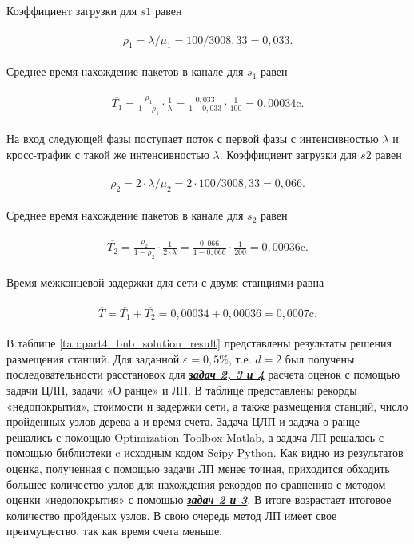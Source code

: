 Коэффициент загрузки для $s1$ равен

\begin{align}
  \begin{aligned}
\rho_1 = \lambda / \mu_1 = 100 / 3008,33 = 0,033.
  \end{aligned}
\end{align}

Среднее время нахождение пакетов в канале для $s_1$ равен

\begin{align}
  \begin{aligned}
  \overline{T_1} = \frac{\rho_1}{1 - \rho_1} \cdot \frac{1}{\lambda} = \frac{0,033}{1 - 0,033} \cdot \frac{1}{100} = 0,00034 \text{c}.
  \end{aligned}
\end{align}

На вход следующей фазы поступает поток с первой фазы с интенсивностью $\lambda$ и кросс-трафик с такой же интенсивностью $\lambda$. Коэффициент загрузки для $s2$ равен

\begin{align}
  \begin{aligned}
\rho_2 = 2 \cdot \lambda / \mu_2 = 2 \cdot 100 / 3008,33 = 0,066.
  \end{aligned}
\end{align}

Среднее время нахождение пакетов в канале для $s_2$ равен

\begin{align}
  \begin{aligned}
  \overline{T_2} = \frac{\rho_2}{1 - \rho_2} \cdot \frac{1}{2 \cdot \lambda} = \frac{0,066}{1 - 0,066} \cdot \frac{1}{200} = 0,00036 \text{c}.
  \end{aligned}
\end{align}

Время межконцевой задержки для сети с двумя станциями равна 

\begin{align}
  \begin{aligned}
  \overline{T} =  \overline{T_1} + \overline{T_2} = 0,00034 + 0,00036 = 0,0007 \text{c} .
  \end{aligned}
\end{align}


В таблице \cref{tab:part4_bnb_solution_result} представлены результаты решения размещения станций. Для заданной $\varepsilon= 0,5 \%$, т.е. $d=2$ был получены последовательности расстановок для \underline{\textit{\textbf{задач 2, 3 и 4}}} расчета оценок с помощью задачи ЦЛП, задачи «О ранце» и ЛП. В таблице представлены рекорды «недопокрытия», стоимости и задержки сети, а также размещения станций, число пройденных узлов дерева а и время счета.
Задача ЦЛП и задача о ранце решались с помощью Optimization Toolbox Matlab, а задача ЛП решалась с помощью библиотеки c исходным кодом Scipy Python. Как видно из результатов оценка, полученная с помощью задачи ЛП менее точная, приходится обходить большее количество узлов для нахождения рекордов по сравнению с методом оценки «недопокрытия» с помощью \underline{\textit{\textbf{задач 2 и 3}}}. В итоге возрастает итоговое количество пройденых узлов. В свою очередь метод ЛП имеет свое преимущество, так как время счета меньше.


